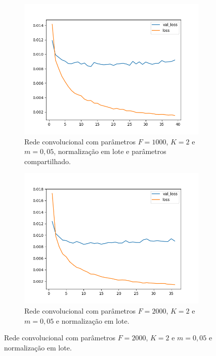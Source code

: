 \begin{figure}[H]
\begin{subfigure}{.5\textwidth}
  \label{fig:cnn-1000-k-2-m-005-normalizacao-em-lote-v2}
\end{subfigure}
\begin{subfigure}{.5\textwidth}
  \centering
  \caption{Rede convolucional com parâmetros $F = 1000$, $K = 2$ e $m = 0,05$, normalização em lote e parâmetros compartilhado.}
  \includegraphics[width=.8\linewidth]{figuras/ape-ajustes-hiper-parametros/shared-cnn-with-bn-1000-k-2-m-005.png}
  
  \label{fig:shared-cnn-1000-k-2-m-005-normalizacao-em-lote}
\end{subfigure}
\begin{subfigure}{.5\textwidth}
  \centering
  \caption{Rede convolucional com parâmetros $F = 2000$, $K = 2$ e $m = 0,05$ e normalização em lote.}
  \includegraphics[width=.8\linewidth]{figuras/ape-ajustes-hiper-parametros/cnn-with-bn-2000-k-2-m-005.png}
  

\end{subfigure}
\end{figure}
